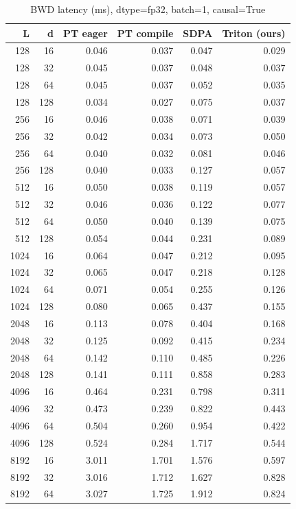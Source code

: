 \documentclass[11pt]{article}
\begin{document}
\begin{table}[H]\small\centering
\caption{BWD latency (ms), dtype=fp32, batch=1, causal=True}
\label{tab:fa2-fp32-bwd}
\begin{tabular}{rrrrrr}
\toprule
L & d & PT eager & PT compile & SDPA & Triton (ours) \\
\midrule
128 & 16 & 0.046 & 0.037 & 0.047 & 0.029 \\
128 & 32 & 0.045 & 0.037 & 0.048 & 0.037 \\
128 & 64 & 0.045 & 0.037 & 0.052 & 0.035 \\
128 & 128 & 0.034 & 0.027 & 0.075 & 0.037 \\
256 & 16 & 0.046 & 0.038 & 0.071 & 0.039 \\
256 & 32 & 0.042 & 0.034 & 0.073 & 0.050 \\
256 & 64 & 0.040 & 0.032 & 0.081 & 0.046 \\
256 & 128 & 0.040 & 0.033 & 0.127 & 0.057 \\
512 & 16 & 0.050 & 0.038 & 0.119 & 0.057 \\
512 & 32 & 0.046 & 0.036 & 0.122 & 0.077 \\
512 & 64 & 0.050 & 0.040 & 0.139 & 0.075 \\
512 & 128 & 0.054 & 0.044 & 0.231 & 0.089 \\
1024 & 16 & 0.064 & 0.047 & 0.212 & 0.095 \\
1024 & 32 & 0.065 & 0.047 & 0.218 & 0.128 \\
1024 & 64 & 0.071 & 0.054 & 0.255 & 0.126 \\
1024 & 128 & 0.080 & 0.065 & 0.437 & 0.155 \\
2048 & 16 & 0.113 & 0.078 & 0.404 & 0.168 \\
2048 & 32 & 0.125 & 0.092 & 0.415 & 0.234 \\
2048 & 64 & 0.142 & 0.110 & 0.485 & 0.226 \\
2048 & 128 & 0.141 & 0.111 & 0.858 & 0.283 \\
4096 & 16 & 0.464 & 0.231 & 0.798 & 0.311 \\
4096 & 32 & 0.473 & 0.239 & 0.822 & 0.443 \\
4096 & 64 & 0.504 & 0.260 & 0.954 & 0.422 \\
4096 & 128 & 0.524 & 0.284 & 1.717 & 0.544 \\
8192 & 16 & 3.011 & 1.701 & 1.576 & 0.597 \\
8192 & 32 & 3.016 & 1.712 & 1.627 & 0.828 \\
8192 & 64 & 3.027 & 1.725 & 1.912 & 0.824 \\

\end{tabular}
\end{table}
\end{document}
